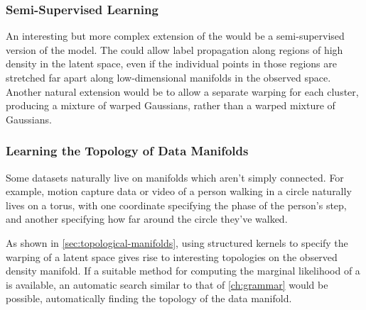 

\subsubsection{Semi-Supervised Learning}

An interesting but more complex extension of the \iwmm{} would be a semi-supervised version of the model.
The \iwmm{} could allow label propagation along regions of high density in the latent space, even if the individual points in those regions are stretched far apart along low-dimensional manifolds in the observed space.
Another natural extension would be to allow a separate warping for each cluster, producing a mixture of warped Gaussians, rather than a warped mixture of Gaussians.%




\subsubsection{Learning the Topology of Data Manifolds}

Some datasets naturally live on manifolds which aren't simply connected.
For example, motion capture data or video of a person walking in a circle naturally lives on a torus, with one coordinate specifying the phase of the person's step, and another specifying how far around the circle they've walked.

As shown in \cref{sec:topological-manifolds}, using structured kernels to specify the warping of a latent space gives rise to interesting topologies on the observed density manifold.
If a suitable method for computing the marginal likelihood of a \gplvm{} is available, an automatic search similar to that of \cref{ch:grammar} would be possible, automatically finding the topology of the data manifold.





